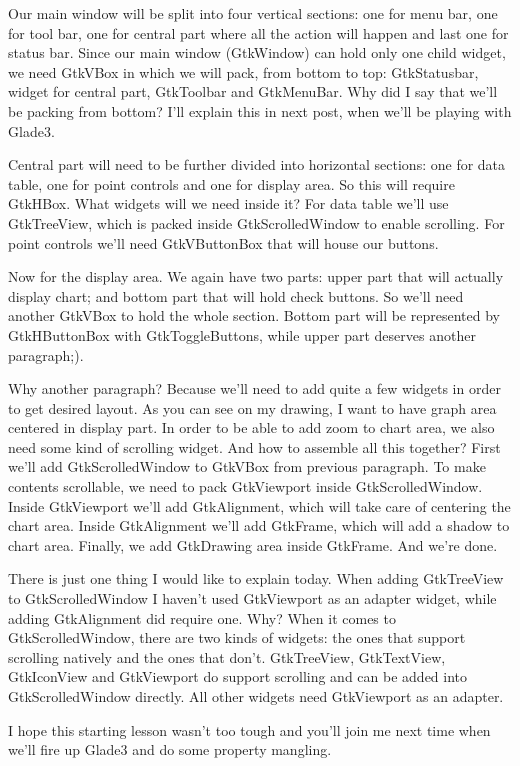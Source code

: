 \documentclass[a4paper,openany,twoside,draft]{book}
\begin{document}
Our main window will be split into four vertical sections: one for menu bar, one for tool bar, one for central part where all the action will happen and last one for status bar. Since our main window (GtkWindow) can hold only one child widget, we need GtkVBox in which we will pack, from bottom to top: GtkStatusbar, widget for central part, GtkToolbar and GtkMenuBar. Why did I say that we'll be packing from bottom? I'll explain this in next post, when we'll be playing with Glade3.

Central part will need to be further divided into horizontal sections: one for data table, one for point controls and one for display area. So this will require GtkHBox. What widgets will we need inside it? For data table we'll use GtkTreeView, which is packed inside GtkScrolledWindow to enable scrolling. For point controls we'll need GtkVButtonBox that will house our buttons.

Now for the display area. We again have two parts: upper part that will actually display chart; and bottom part that will hold check buttons. So we'll need another GtkVBox to hold the whole section. Bottom part will be represented by GtkHButtonBox with GtkToggleButtons, while upper part deserves another paragraph;).

Why another paragraph? Because we'll need to add quite a few widgets in order to get desired layout. As you can see on my drawing, I want to have graph area centered in display part. In order to be able to add zoom to chart area, we also need some kind of scrolling widget. And how to assemble all this together? First we'll add GtkScrolledWindow to GtkVBox from previous paragraph. To make contents scrollable, we need to pack GtkViewport inside GtkScrolledWindow. Inside GtkViewport we'll add GtkAlignment, which will take care of centering the chart area. Inside GtkAlignment we'll add GtkFrame, which will add a shadow to chart area. Finally, we add GtkDrawing area inside GtkFrame. And we're done.

There is just one thing I would like to explain today. When adding GtkTreeView to GtkScrolledWindow I haven't used GtkViewport as an adapter widget, while adding GtkAlignment did require one. Why? When it comes to GtkScrolledWindow, there are two kinds of widgets: the ones that support scrolling natively and the ones that don't. GtkTreeView, GtkTextView, GtkIconView and GtkViewport do support scrolling and can be added into GtkScrolledWindow directly. All other widgets need GtkViewport as an adapter.

I hope this starting lesson wasn't too tough and you'll join me next time when we'll fire up Glade3 and do some property mangling.
\end{document}
